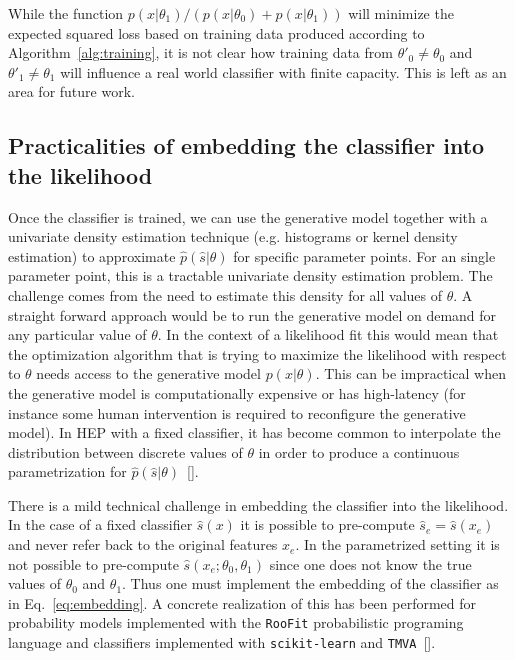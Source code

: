 \documentclass[aoas,preprint]{imsart}
\newcommand{\citek}[1]{[\cite{#1}]}
\numberwithin{equation}{section}
\theoremstyle{plain}
\begin{document}
\bigskip

While the function $p(x|\theta_1)/(p(x|\theta_0)+p(x|\theta_1))$ will minimize the expected squared loss based on 
training data produced according to Algorithm~\ref{alg:training}, it is not clear how training data from $\theta'_0 \ne \theta_0$ and $\theta'_1 \ne \theta_1$ will influence a real world classifier with finite capacity. This is left as an area for future work.

\subsection{Practicalities of embedding the classifier into the likelihood}


Once the classifier is trained, we can use the generative model together with a univariate density estimation technique (e.g. histograms or kernel density estimation) to approximate $\hat{p}(\hat{s}|\theta)$ for specific parameter points. 
For an single parameter point, this is a tractable univariate density estimation problem. The challenge comes from the need to estimate this density for all values of $\theta$. 
A straight forward approach would be to run the generative model on demand for any particular value of $\theta$. 
In the context of a likelihood fit this would mean that the optimization algorithm that is trying to maximize the likelihood with respect to $\theta$ needs access to the generative model $p(x|\theta)$. This can be  impractical when the generative model is computationally expensive or has high-latency (for instance some human intervention is required to reconfigure the generative model).  In  HEP with a fixed classifier, it has become common  to interpolate the distribution between discrete values of $\theta$ in order to produce a continuous parametrization for $\hat p(\hat s | \theta)$~\citek{Cranmer:2012sba}.

There is a mild technical challenge in embedding the classifier into the likelihood. In the case of a fixed classifier $\hat s(x)$ it is possible to pre-compute $\hat s_e=\hat s(x_e)$ and never refer back to the original features $x_e$. In the parametrized setting it is not possible to pre-compute $\hat s(x_e; \theta_0, \theta_1)$ since one does not know the true values of  $\theta_0$ and $\theta_1$. Thus one must implement the embedding of the classifier as in Eq.~\ref{eq:embedding}.  A concrete realization of this has been performed for probability models implemented with the \texttt{RooFit} probabilistic programing language and  classifiers implemented with \texttt{scikit-learn} and \texttt{TMVA}~\citek{Verkerke:2003ir,scikit-learn,Hocker:2007ht}.
\end{document}
